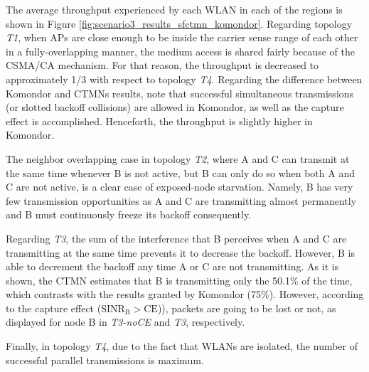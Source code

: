 \documentclass[a4paper]{article}
\begin{document}
	The average throughput experienced by each WLAN in each of the regions is shown in Figure \ref{fig:scenario3_results_sfctmn_komondor}. Regarding topology \textit{T1}, when APs are close enough to be inside the carrier sense range of each other in a fully-overlapping manner, the medium access is shared fairly because of the CSMA/CA mechanism. For that reason, the throughput is decreased to approximately 1/3 with respect to topology \textit{T4}. Regarding the difference between Komondor and CTMNs results, note that successful simultaneous transmissions (or slotted backoff collisions) are allowed in Komondor, as well as the capture effect is accomplished. Henceforth, the throughput is slightly higher in Komondor.
	
	The neighbor overlapping case in topology \textit{T2}, where A and C can transmit at the same time whenever B is not active, but B can only do so when both A and C are not active, is a clear case of exposed-node starvation. Namely, B has very few transmission opportunities as A and C are transmitting almost permanently and B must continuously freeze its backoff consequently. 
	
	Regarding \textit{T3}, the sum of the interference that B perceives when A and C are transmitting at the same time prevents it to decrease the backoff. However, B is able to decrement the backoff any time A or C are not transmitting. As it is shown, the CTMN estimates that B is transmitting only the 50.1\% of the time, which contrasts with the results granted by Komondor (75\%). However, according to the capture effect ($\text{SINR}_\text{B} > \text{CE}$)), packets are going to be lost or not, as displayed for node B in \textit{T3-noCE} and \textit{T3}, respectively.	
	
	Finally, in topology \textit{T4}, due to the fact that WLANs are isolated, the number of successful parallel transmissions is maximum.
	
\end{document}
